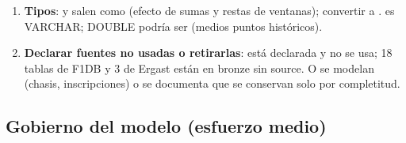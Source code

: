 \begin{enumerate}
\item \textbf{Tipos}:  y  salen como  (efecto de sumas y restas de ventanas); convertir a .  es VARCHAR;  DOUBLE podría ser  (medios puntos históricos).
\item \textbf{Declarar fuentes no usadas o retirarlas}:  está declarada y no se usa; 18 tablas de F1DB y 3 de Ergast están en bronze sin source. O se modelan (chasis, inscripciones) o se documenta que se conservan solo por completitud.
\end{enumerate}

\subsection{Gobierno del modelo (esfuerzo medio)}

